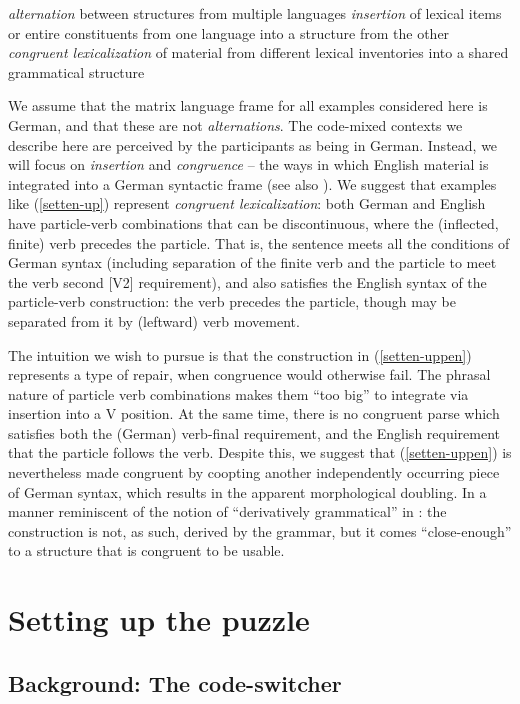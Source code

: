 \documentclass[output=paper]{langscibook}
\begin{document}
\ea\label{muyskentypes}
\ea \textit{alternation} between structures from multiple languages
\ex \textit{insertion} of lexical items or entire constituents from one language into a structure from the other
\ex \textit{congruent lexicalization} of material from different lexical inventories into a shared grammatical structure
\z
\z

We assume that the matrix language frame for all examples considered here is German, and that these are not \textit{alternations}. The code-mixed contexts we describe here are perceived by the participants as being in German. Instead, we will focus on \textit{insertion} and \textit{congruence} -- the ways in which English material is integrated into a German syntactic frame (see also \citealp{myersscotton93}). We suggest that examples like (\ref{setten-up}) represent \textit{congruent lexicalization}: both German and English have particle-verb combinations that can be discontinuous, where the (inflected, finite) verb precedes the particle. That is, the sentence meets all the conditions of German syntax (including separation of the finite verb and the particle to meet the verb second [V2] requirement), and also satisfies the English syntax of the particle-verb construction: the verb precedes the particle, though may be separated from it by (leftward) verb movement.

The intuition we wish to pursue is that the construction in (\ref{setten-uppen}) represents a type of repair, when congruence would otherwise fail. The phrasal nature of particle verb combinations makes them ``too big'' to integrate via insertion into a V position. At the same time, there is no congruent parse which satisfies both the (German) verb-final requirement, and the English requirement that the particle follows the verb. Despite this, we suggest that (\ref{setten-uppen}) is nevertheless made congruent by coopting another independently occurring piece of German syntax, which results in the apparent morphological doubling. In a manner reminiscent of the notion of ``derivatively grammatical'' in \citet[242]{chomsky65}: the construction is not, as such, derived by the grammar, but it comes ``close-enough'' to a structure that is congruent to be usable.

 

\section{Setting up the puzzle}

\subsection{Background: The code-switcher}
\end{document}
